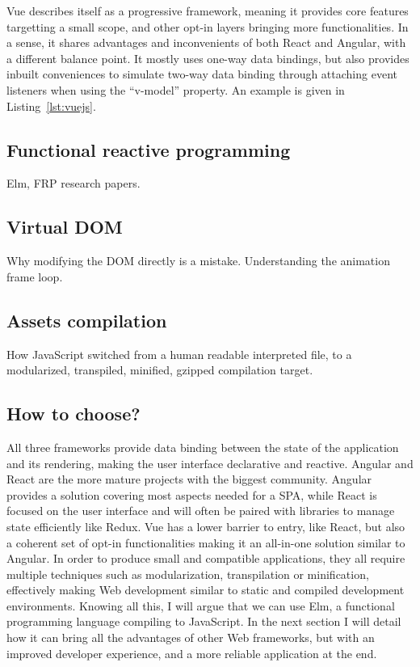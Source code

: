Vue describes itself as a progressive framework,
meaning it provides core features targetting a small scope,
and other opt-in layers bringing more functionalities.
In a sense, it shares advantages and inconvenients of both
React and Angular, with a different balance point.
It mostly uses one-way data bindings,
but also provides inbuilt conveniences to simulate two-way data binding
through attaching event listeners when using the ``v-model'' property.
An example is given in Listing~\ref{lst:vuejs}.




\subsection{Functional reactive programming}%
\label{sub:functional_reactive_programming}

Elm, FRP research papers.

\subsection{Virtual DOM}%
\label{sub:virtual_dom}

Why modifying the DOM directly is a mistake.
Understanding the animation frame loop.

\subsection{Assets compilation}%
\label{sub:assets_compilation}

How JavaScript switched from a human readable interpreted file,
to a modularized, transpiled, minified, gzipped compilation target.


\subsection{How to choose?}%
\label{sub:how_to_choose_}

All three frameworks provide data binding between the state of the application
and its rendering, making the user interface declarative and reactive.
Angular and React are the more mature projects with
the biggest community.
Angular provides a solution covering most aspects needed for a SPA,
while React is focused on the user interface and will often be paired
with libraries to manage state efficiently like Redux.
Vue has a lower barrier to entry, like React,
but also a coherent set of opt-in functionalities making it an all-in-one solution similar to Angular.
In order to produce small and compatible applications,
they all require multiple techniques such as modularization,
transpilation or minification, effectively making Web development similar
to static and compiled development environments.
Knowing all this, I will argue that we can use Elm,
a functional programming language compiling to JavaScript.
In the next section I will detail how it can bring
all the advantages of other Web frameworks,
but with an improved developer experience,
and a more reliable application at the end.

